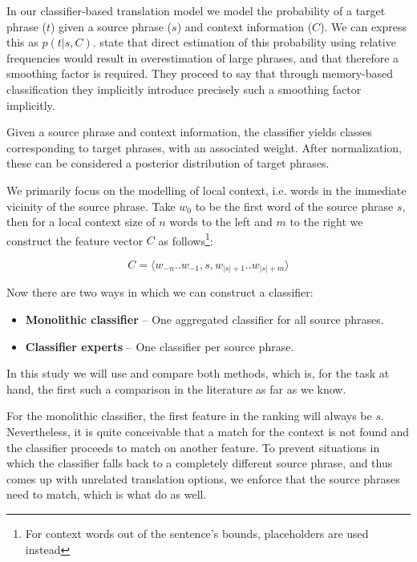 \documentclass[smallextended]{svjour3}       %
\theoremstyle{break}
\begin{document}
In our classifier-based translation model we model the probability
of a target phrase ($t$) given a source phrase ($s$) and context information
($C$). We can express this as $p(t|s,C)$.  \cite{Stroppa+07} state that
direct estimation of this probability using relative frequencies would result
in overestimation of large phrases, and that therefore a smoothing factor is
required. They proceed to say that through memory-based classification they
implicitly introduce precisely such a smoothing factor implicitly.

Given a source phrase and context information, the classifier yields classes
corresponding to target phrases, with an associated weight. After
normalization, these can be considered a posterior distribution of
target phrases. 

We primarily focus on the modelling of local context, i.e. words in the
immediate vicinity of the source phrase. Take $w_0$ to be the first word of
the source phrase $s$, then for a local context size of $n$ words to the left and
$m$ to the right we construct the feature vector $C$ as
follows\footnote{For context words out of the sentence's bounds, placeholders
are used instead}:

\begin{equation}
  C = \langle w_{-n} .. w_{-1} , s , w_{|s|+1} .. w_{|s|+m} \rangle
\end{equation}

Now there are two ways in which we can construct a classifier:

\begin{itemize}
  \item \textbf{Monolithic classifier} -- One aggregated classifier for all
    source phrases.
  \item \textbf{Classifier experts} -- One classifier per source phrase.
\end{itemize}

In this study we will use and compare both methods, which is, for the task at
hand, the first such a comparison in the literature as far as we know.

For the monolithic classifier, the first feature in the ranking will always be
$s$. Nevertheless, it is quite conceivable that a match for the context is not
found and the classifier proceeds to match on another feature. To prevent
situations in which the classifier falls back to a completely different source
phrase, and thus comes up with unrelated translation options, we enforce that
the source phrases need to match, which is what \cite{Stroppa+07} do as
well.
\end{document}
